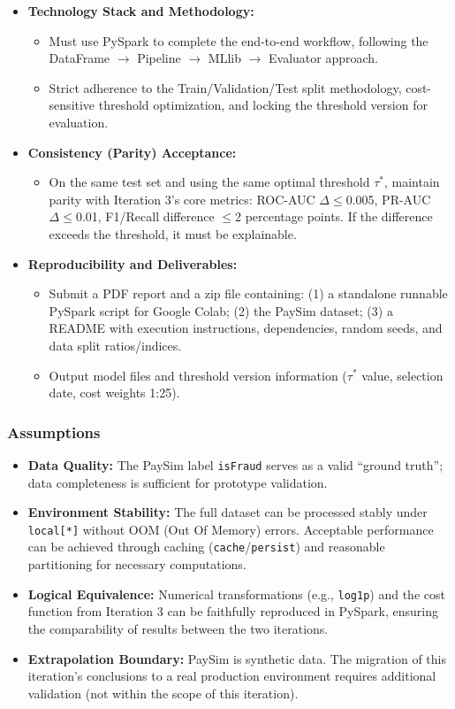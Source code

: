 \documentclass[sigplan,screen]{acmart}
\begin{document}
\begin{itemize}
\item \textbf{Technology Stack and Methodology:}
\begin{itemize}
\item Must use PySpark to complete the end-to-end workflow, following the DataFrame $\rightarrow$ Pipeline $\rightarrow$ MLlib $\rightarrow$ Evaluator approach.
\item Strict adherence to the Train/Validation/Test split methodology, cost-sensitive threshold optimization, and locking the threshold version for evaluation.
\end{itemize}
\item \textbf{Consistency (Parity) Acceptance:}
\begin{itemize}
\item On the same test set and using the same optimal threshold $\tau^*$, maintain parity with Iteration 3's core metrics: ROC-AUC $\Delta\leq$0.005, PR-AUC $\Delta\leq$0.01, F1/Recall difference $\leq$2 percentage points. If the difference exceeds the threshold, it must be explainable.
\end{itemize}
\item \textbf{Reproducibility and Deliverables:}
\begin{itemize}
\item Submit a PDF report and a zip file containing: (1) a standalone runnable PySpark script for Google Colab; (2) the PaySim dataset; (3) a README with execution instructions, dependencies, random seeds, and data split ratios/indices.
\item Output model files and threshold version information ($\tau^*$ value, selection date, cost weights 1:25).
\end{itemize}
\end{itemize}

\subsubsection{Assumptions}

\begin{itemize}
\item \textbf{Data Quality:} The PaySim label \texttt{isFraud} serves as a valid ``ground truth''; data completeness is sufficient for prototype validation.
\item \textbf{Environment Stability:} The full dataset can be processed stably under \texttt{local[*]} without OOM (Out Of Memory) errors. Acceptable performance can be achieved through caching (\texttt{cache}/\texttt{persist}) and reasonable partitioning for necessary computations.
\item \textbf{Logical Equivalence:} Numerical transformations (e.g., \texttt{log1p}) and the cost function from Iteration 3 can be faithfully reproduced in PySpark, ensuring the comparability of results between the two iterations.
\item \textbf{Extrapolation Boundary:} PaySim is synthetic data. The migration of this iteration's conclusions to a real production environment requires additional validation (not within the scope of this iteration).
\end{itemize}
\end{document}
